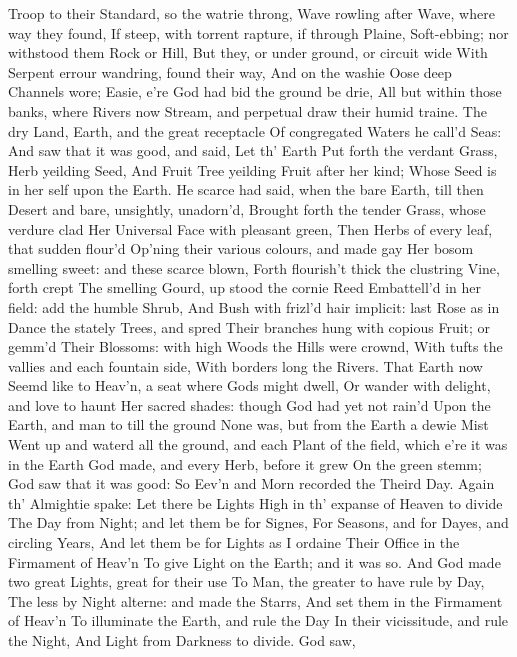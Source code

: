 \documentclass[11pt]{book}
\newcounter {last}
\begin{document}
Troop to their Standard, so the watrie throng, 
Wave rowling after Wave, where way they found, 
If steep, with torrent rapture, if through Plaine, 
Soft-ebbing; nor withstood them Rock or Hill, 
But they, or under ground, or circuit wide 
With Serpent errour wandring, found their way, 
And on the washie Oose deep Channels wore; 
Easie, e're God had bid the ground be drie, 
All but within those banks, where Rivers now 
Stream, and perpetual draw their humid traine. 
The dry Land, Earth, and the great receptacle 
Of congregated Waters he call'd Seas: 
And saw that it was good, and said, Let th' Earth 
Put forth the verdant Grass, Herb yeilding Seed, 
And Fruit Tree yeilding Fruit after her kind; 
Whose Seed is in her self upon the Earth. 
He scarce had said, when the bare Earth, till then 
Desert and bare, unsightly, unadorn'd, 
Brought forth the tender Grass, whose verdure clad 
Her Universal Face with pleasant green, 
Then Herbs of every leaf, that sudden flour'd 
Op'ning their various colours, and made gay 
Her bosom smelling sweet: and these scarce blown, 
Forth flourish't thick the clustring Vine, forth crept 
The smelling Gourd, up stood the cornie Reed 
Embattell'd in her field: add the humble Shrub, 
And Bush with frizl'd hair implicit: last 
Rose as in Dance the stately Trees, and spred 
Their branches hung with copious Fruit; or gemm'd 
Their Blossoms: with high Woods the Hills were crownd, 
With tufts the vallies and each fountain side, 
With borders long the Rivers.  That Earth now 
Seemd like to Heav'n, a seat where Gods might dwell, 
Or wander with delight, and love to haunt 
Her sacred shades: though God had yet not rain'd 
Upon the Earth, and man to till the ground 
None was, but from the Earth a dewie Mist 
Went up and waterd all the ground, and each 
Plant of the field, which e're it was in the Earth 
God made, and every Herb, before it grew 
On the green stemm; God saw that it was good: 
So Eev'n and Morn recorded the Theird Day. 
\quad Again th' Almightie spake: Let there be Lights 
High in th' expanse of Heaven to divide 
The Day from Night; and let them be for Signes, 
For Seasons, and for Dayes, and circling Years, 
And let them be for Lights as I ordaine 
Their Office in the Firmament of Heav'n 
To give Light on the Earth; and it was so. 
And God made two great Lights, great for their use 
To Man, the greater to have rule by Day, 
The less by Night alterne: and made the Starrs, 
And set them in the Firmament of Heav'n 
To illuminate the Earth, and rule the Day 
In their vicissitude, and rule the Night, 
And Light from Darkness to divide.  God saw, 
\end{document}

